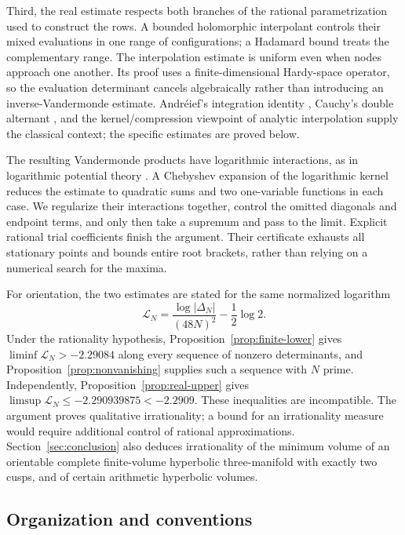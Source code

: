 Third, the real estimate respects both branches of the rational
parametrization used to construct the rows. A bounded holomorphic
interpolant controls their mixed evaluations in one range of
configurations; a Hadamard bound treats the complementary range.
The interpolation estimate is uniform even when nodes approach one
another. Its proof uses a finite-dimensional Hardy-space operator,
so the evaluation determinant cancels algebraically rather than
introducing an inverse-Vandermonde estimate.
Andr\'eief's integration identity \cite{Andreief1886,Forrester2018Andreief},
Cauchy's double alternant \cite{Cauchy1841,Krattenthaler1999}, and the
kernel/compression viewpoint of analytic interpolation
\cite{Sarason1967} supply the classical context; the
specific estimates are proved below.

The resulting Vandermonde products have logarithmic interactions,
as in logarithmic potential theory \cite{Saff2010}.
A Chebyshev expansion of the logarithmic kernel
\cite[Lemma~3.1]{GaroufalidisPopescu2013} reduces the estimate to
quadratic sums and two one-variable functions in each case. We regularize
their interactions together, control the omitted diagonals and endpoint
terms, and only then take a supremum and pass to the limit.
Explicit rational trial coefficients finish the argument. Their
certificate exhausts all stationary points and bounds entire root
brackets, rather than relying on a numerical search for the maxima.

For orientation, the two estimates are stated for the same normalized
logarithm
\begin{equation}\label{eq:normalized-logarithm}
\mathcal L_N=\frac{\log|\Delta_N|}{(48N)^2}-\frac12\log 2.
\end{equation}
Under the rationality hypothesis, Proposition~\ref{prop:finite-lower}
gives $\liminf\mathcal L_N>-2.29084$ along every sequence of nonzero
determinants, and Proposition~\ref{prop:nonvanishing} supplies such a
sequence with $N$ prime. Independently,
Proposition~\ref{prop:real-upper} gives
$\limsup\mathcal L_N\le-2.290939875<-2.2909$.
These inequalities are incompatible. The argument proves qualitative
irrationality; a bound for an irrationality measure would require
additional control of rational approximations.
Section~\ref{sec:conclusion} also deduces irrationality of the minimum
volume of an orientable complete finite-volume hyperbolic three-manifold
with exactly two cusps, and of certain arithmetic hyperbolic volumes.

\subsection{Organization and conventions}

